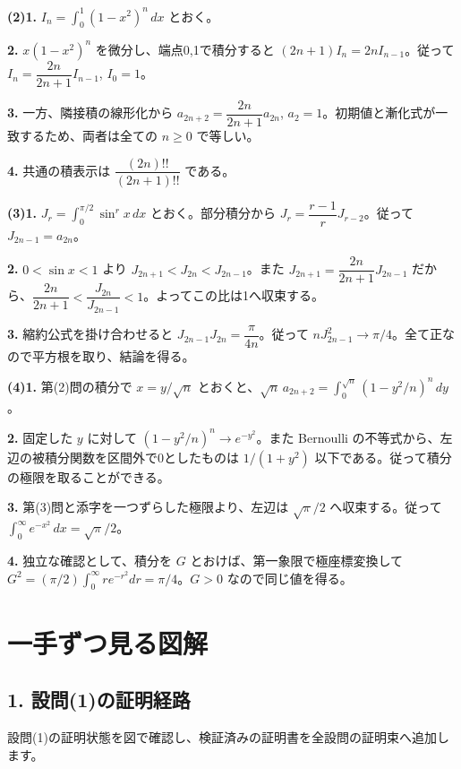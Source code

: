 \documentclass[uplatex,dvipdfmx,11pt]{jsarticle}
\begin{document}
\textbf{(2)}\quad \textbf{1.} \(I_n=\int_0^1(1-x^2)^{n}\,dx\) とおく。

\textbf{2.} \(x(1-x^2)^{n}\) を微分し、端点0,1で積分すると \((2n+1)I_n=2nI_{n-1}\)。従って \(I_n=\dfrac{2n}{2n+1}I_{n-1}\), \(I_0=1\)。

\textbf{3.} 一方、隣接積の線形化から \(a_{2n+2}=\dfrac{2n}{2n+1}a_{2n}\), \(a_2=1\)。初期値と漸化式が一致するため、両者は全ての \(n\ge0\) で等しい。

\textbf{4.} 共通の積表示は \(\dfrac{(2n)!!}{(2n+1)!!}\) である。

\textbf{(3)}\quad \textbf{1.} \(J_r=\int_0^{\pi/2}\sin^r x\,dx\) とおく。部分積分から \(J_r=\dfrac{r-1}rJ_{r-2}\)。従って \(J_{2n-1}=a_{2n}\)。

\textbf{2.} \(0<\sin x<1\) より \(J_{2n+1}<J_{2n}<J_{2n-1}\)。また \(J_{2n+1}=\dfrac{2n}{2n+1}J_{2n-1}\) だから、\(\dfrac{2n}{2n+1}<\dfrac{J_{2n}}{J_{2n-1}}<1\)。よってこの比は1へ収束する。

\textbf{3.} 縮約公式を掛け合わせると \(J_{2n-1}J_{2n}=\dfrac{\pi}{4n}\)。従って \(nJ_{2n-1}^2\to\pi/4\)。全て正なので平方根を取り、結論を得る。

\textbf{(4)}\quad \textbf{1.} 第(2)問の積分で \(x=y/\sqrt n\) とおくと、\(\sqrt n\,a_{2n+2}=\int_0^{\sqrt n}(1-y^2/n)^n\,dy\)。

\textbf{2.} 固定した \(y\) に対して \((1-y^2/n)^n\to e^{-y^2}\)。また Bernoulli の不等式から、左辺の被積分関数を区間外で0としたものは \(1/(1+y^2)\) 以下である。従って積分の極限を取ることができる。

\textbf{3.} 第(3)問と添字を一つずらした極限より、左辺は \(\sqrt\pi/2\) へ収束する。従って \(\int_0^\infty e^{-x^2}\,dx=\sqrt\pi/2\)。

\textbf{4.} 独立な確認として、積分を \(G\) とおけば、第一象限で極座標変換して \(G^2=(\pi/2)\int_0^\infty re^{-r^2}dr=\pi/4\)。\(G>0\) なので同じ値を得る。

\clearpage

\section*{一手ずつ見る図解}

\subsection*{1. 設問(1)の証明経路}

設問(1)の証明状態を図で確認し、検証済みの証明書を全設問の証明束へ追加します。
\end{document}
